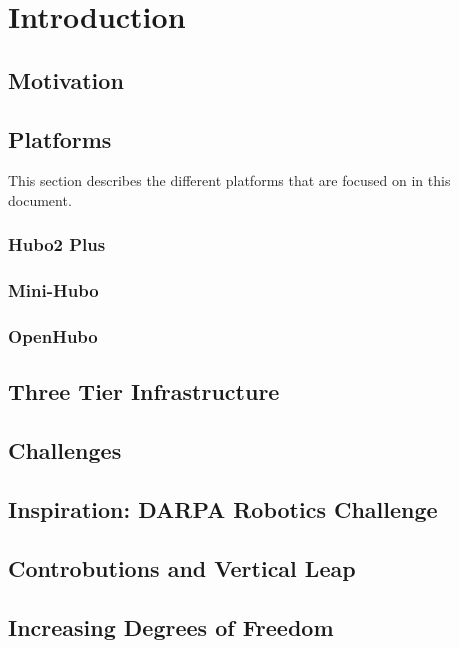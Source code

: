 \chapter{Introduction}
	


	\section{Motivation}\label{sec:roadmap}	
		

	\section{Platforms}\label{sec:robots}
	This section describes the different platforms that are focused on in this document.
		\subsection{Hubo2 Plus}\label{sec:hubo}
			
		\subsection{Mini-Hubo}\label{sec:mini-hubo}
			
		\subsection{OpenHubo}\label{sec:openhubo}
			
		








	\section{Three Tier Infrastructure}\label{sec:threeTier}
		
	\section{Challenges}\label{sec:challenges}
		


	\section{Inspiration: DARPA Robotics Challenge}\label{sec:drc}
    		

    	\section{Controbutions and Vertical Leap}
		

   	\section{Increasing Degrees of Freedom}\label{sec:numdof}
		



			
			
			
			
			

	

